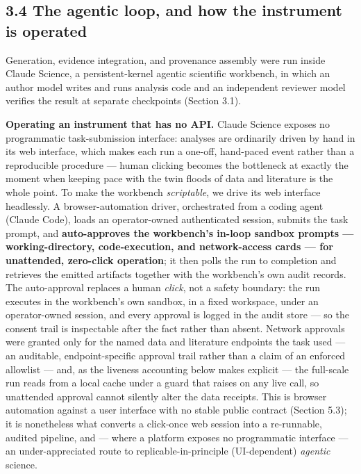 \subsection*{3.4 The agentic loop, and how the instrument is operated}\label{the-agentic-loop-and-how-the-instrument-is-operated}

Generation, evidence integration, and provenance assembly were run inside Claude Science, a persistent-kernel
agentic scientific workbench, in which an author model writes and runs analysis code and an independent
reviewer model verifies the result at separate checkpoints (Section 3.1).

\noindent \textbf{Operating an instrument that has no API.} Claude Science exposes no programmatic task-submission
interface: analyses are ordinarily driven by hand in its web interface, which makes each run a one-off,
hand-paced event rather than a reproducible procedure --- human clicking becomes the bottleneck at exactly
the moment when keeping pace with the twin floods of data and literature is the whole point. To make the
workbench \emph{scriptable}, we drive its web interface
headlessly. A browser-automation driver, orchestrated from a coding agent (Claude Code), loads an operator-owned
authenticated session, submits the task prompt, and \textbf{auto-approves the workbench's in-loop sandbox
prompts --- working-directory, code-execution, and network-access cards --- for unattended, zero-click
operation}; it then polls the run to completion and retrieves the emitted artifacts together with the
workbench's own audit records. The auto-approval replaces a human \emph{click}, not a safety boundary: the run
executes in the workbench's own sandbox, in a fixed workspace, under an operator-owned session, and every
approval is logged in the audit store --- so the consent trail is inspectable after the fact rather than
absent. Network approvals were granted only for the named data and literature endpoints the task used --- an
auditable, endpoint-specific approval trail rather than a claim of an enforced allowlist --- and, as the
liveness accounting below makes explicit --- the full-scale run reads from a local cache under a guard that
raises on any live call, so unattended approval cannot silently alter the data receipts. This
is browser automation against a user interface with no stable public contract (Section 5.3); it is
nonetheless what converts a click-once web session into a re-runnable, audited pipeline, and --- where a
platform exposes no programmatic interface --- an under-appreciated route to replicable-in-principle
(UI-dependent) \emph{agentic} science.

